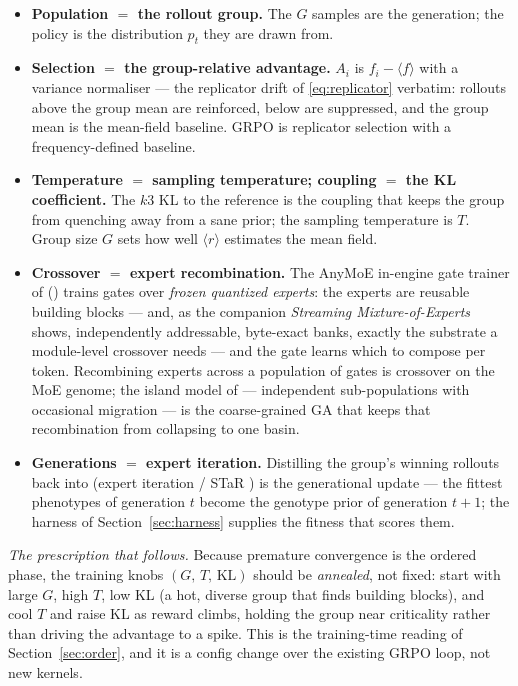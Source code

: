 \documentclass[11pt]{article}
\newcommand{\avg}[1]{\langle #1 \rangle}
\begin{document}
\begin{itemize}[leftmargin=1.4em]
\item \textbf{Population $=$ the rollout group.} The $G$ samples are the generation; the policy is the
distribution $p_t$ they are drawn from.
\item \textbf{Selection $=$ the group-relative advantage.} $A_i$ is $f_i-\avg{f}$ with a variance
normaliser --- the replicator drift of \eqref{eq:replicator} verbatim: rollouts above the group mean are
reinforced, below are suppressed, and the group mean is the mean-field baseline. GRPO is replicator selection
with a frequency-defined baseline.
\item \textbf{Temperature $=$ sampling temperature; coupling $=$ the KL coefficient.} The $k3$ KL to the
reference is the coupling that keeps the group from quenching away from a sane prior; the sampling temperature
is $T$. Group size $G$ sets how well $\avg{r}$ estimates the mean field.
\item \textbf{Crossover $=$ expert recombination.} The AnyMoE in-engine gate trainer of
\cite{hanzo-native-training} () trains gates over \emph{frozen quantized experts}: the experts
are reusable building blocks --- and, as the companion \emph{Streaming Mixture-of-Experts}
\cite{hanzo-streaming-experts} shows, independently addressable, byte-exact banks, exactly the substrate a
module-level crossover needs --- and the gate learns which to compose per token. Recombining experts across a
population of gates is crossover on the MoE genome; the island model of \cite{hanzo-intrinsic-islands} ---
independent sub-populations with occasional migration --- is the coarse-grained GA that keeps that
recombination from collapsing to one basin.
\item \textbf{Generations $=$ expert iteration.} Distilling the group's winning rollouts back into
 (expert iteration / STaR \cite{zelikman2022star}) is the generational update --- the fittest
phenotypes of generation $t$ become the genotype prior of generation $t{+}1$; the harness of
Section~\ref{sec:harness} supplies the fitness that scores them.
\end{itemize}

\noindent\emph{The prescription that follows.} Because premature convergence is the ordered phase, the
training knobs $(G,\,T,\,\text{KL})$ should be \emph{annealed}, not fixed: start with large $G$, high $T$, low
KL (a hot, diverse group that finds building blocks), and cool $T$ and raise KL as reward climbs, holding the
group near criticality rather than driving the advantage to a spike. This is the training-time reading of
Section~\ref{sec:order}, and it is a config change over the existing GRPO loop, not new kernels.
\end{document}
